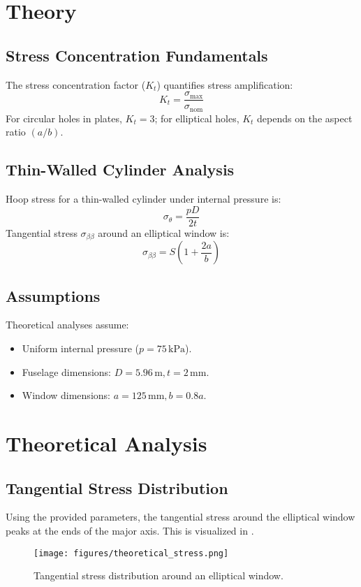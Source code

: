 \documentclass[a4paper,11pt]{article}
\begin{document}
\section{Theory}
\subsection{Stress Concentration Fundamentals}
The stress concentration factor (\(K_t\)) quantifies stress amplification:
\[
K_t = \frac{\sigma_{\text{max}}}{\sigma_{\text{nom}}}
\]
For circular holes in plates, \(K_t = 3\); for elliptical holes, \(K_t\) depends on the aspect ratio \((a/b)\).

\subsection{Thin-Walled Cylinder Analysis}
Hoop stress for a thin-walled cylinder under internal pressure is:
\[
\sigma_{\theta} = \frac{pD}{2t}
\]
Tangential stress \(\sigma_{\beta\beta}\) around an elliptical window is:
\[
\sigma_{\beta\beta} = S \left(1 + \frac{2a}{b}\right)
\]

\subsection{Assumptions}
Theoretical analyses assume:
\begin{itemize}
    \item Uniform internal pressure (\(p = 75 \, \text{kPa}\)).
    \item Fuselage dimensions: \(D = 5.96 \, \text{m}, t = 2 \, \text{mm}\).
    \item Window dimensions: \(a = 125 \, \text{mm}, b = 0.8a\).
\end{itemize}

\newpage

\section{Theoretical Analysis}
\subsection{Tangential Stress Distribution}
Using the provided parameters, the tangential stress around the elliptical window peaks at the ends of the major axis. This is visualized in .

\begin{figure}[H]
    \centering
    \texttt{[image: figures/theoretical\_stress.png]}
    \caption{Tangential stress distribution around an elliptical window.}
    \label{fig:theoretical_stress}
\end{figure}
\end{document}
